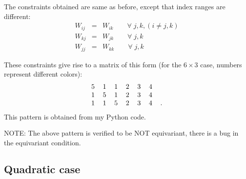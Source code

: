 The constraints obtained are same as before, except that index ranges are different:
\begin{eqnarray}
W_{ij} &=& W_{ik} \quad \quad \forall \;  j, k, (i \neq j, k) \nonumber \\
W_{kj} &=& W_{jk} \quad \quad \forall \;  j, k \nonumber \\
W_{jj} &=& W_{kk} \quad \quad \forall \;  j, k \nonumber
\end{eqnarray}

These constraints give rise to a matrix of this form (for the $6 \times 3$ case, numbers represent different colors):
\begin{equation}
\begin{tabular}{c c c c c c c}
5 & 1 & 1 & 2 & 3 & 4 & \\
1 & 5 & 1 & 2 & 3 & 4 & \\
1 & 1 & 5 & 2 & 3 & 4 & .
\end{tabular} 
\end{equation}This pattern is obtained from my Python code.

NOTE:  The above pattern is verified to be NOT equivariant, there is a bug in the equivariant condition.

\subsection{Quadratic case}

